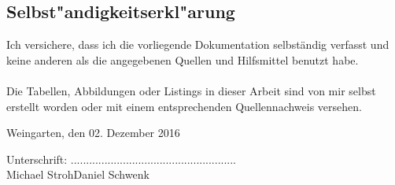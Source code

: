 \section*{Selbst"andigkeitserkl"arung}
\thispagestyle{empty}


Ich versichere, dass ich die vorliegende Dokumentation selbständig verfasst und keine anderen als die angegebenen Quellen und Hilfsmittel benutzt habe.\\
\setlength{\parindent}{0pt}\\
Die Tabellen, Abbildungen oder Listings in dieser Arbeit sind von mir selbst erstellt worden oder mit einem entsprechenden Quellennachweis versehen.

\vspace{0.5cm}\noindent\hspace{1.5cm}

Weingarten, den 02. Dezember 2016

\vspace{1cm}\noindent\hspace{1.5cm}

Unterschrift: \noindent\hspace*{10mm}...........................\hspace*{10mm}...........................\\
\noindent\hspace*{34.5mm}Michael Stroh\hspace*{16.2mm}Daniel Schwenk


\newpage
\thispagestyle{empty}
\chapter*{ }
\thispagestyle{empty}